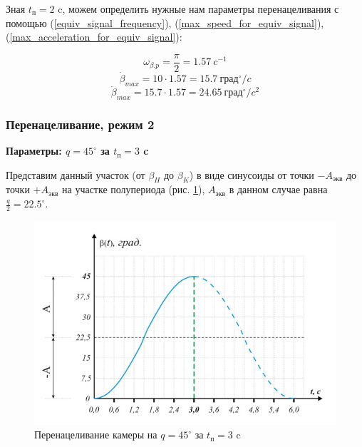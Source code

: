 Зная $t_{\text{п} } = 2$ c, можем определить нужные нам параметры перенацеливания
с помощью (\ref{equiv_signal_frequency}),
(\ref{max_speed_for_equiv_signal}),
(\ref{max_acceleration_for_equiv_signal}):

$$
    \omega_{\beta.p} = \frac{\pi}{2} = 1.57 ~c^{-1}
$$
$$
    \dot{\beta}_{max} = 10 \cdot 1.57 = 15.7 ~\text{град}^{\circ} / c
$$
$$
    \ddot{\beta}_{max} = 15.7 \cdot 1.57 = 24.65 ~\text{град}^{\circ} / c^{2}
$$

\subsubsection{Перенацеливание, режим 2}

\textbf{Параметры: $q = 45^{\circ}$ за $t_{\text{п}} = 3$ c}

Представим данный участок (от $\beta_{H}$ до $\beta_{K}$) в виде синусоиды от
точки $-A_\text{экв}$ до точки $+A_\text{экв}$ на участке полупериода
(рис. \ref{retarget_45grad_3sec}), $A_\text{экв}$ в данном случае равна
$\frac{q}{2} = 22.5^{\circ}$.

\begin{figure}[h!]
    \centering
    \includegraphics[keepaspectratio]{./src/pictures/retarget_equivalent_input_signals/45grad_3sec}
    \caption{Перенацеливание камеры на $q = 45^{\circ}$ за $t_\text{п} = 3$ c}
    \label{retarget_45grad_3sec}
\end{figure}

